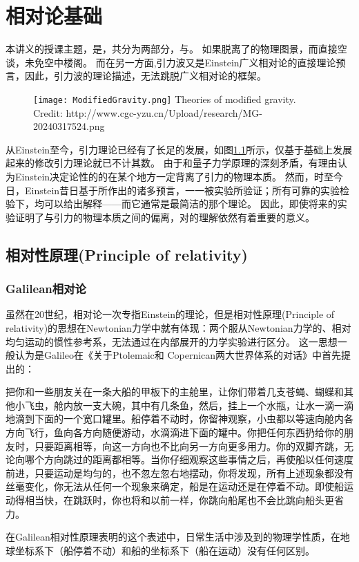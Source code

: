 \chapter{相对论基础}

本讲义的授课主题，是\gw\DA，共分为两部分，\emph{\gw}与\emph{\DA}。
如果脱离了\gw 的物理图景，而直接空谈\DA，未免空中楼阁。
而在另一方面,引力波又是Einstein广义相对论的直接理论预言，因此，引力波的理论描述，无法跳脱广义相对论的框架。

\begin{figure}[htp]
\centering
\texttt{[image: ModifiedGravity.png]}
  {Theories of modified gravity. Credit: http://www.cgc-yzu.cn/Upload/research/MG-20240317524.png}
\label{fig:ModGrav}
\end{figure}

从Einstein至今，引力理论已经有了长足的发展，如图\ref{fig:ModGrav}所示，仅基于\GR 基础上发展起来的修改引力理论就已不计其数。
由于和量子力学原理的深刻矛盾，有理由认为Einstein决定论性的的\GR 在某个地方一定背离了引力的物理本质。
然而，时至今日，Einstein昔日基于\GR 所作出的诸多预言，一一被实验所验证；所有可靠的实验检验下，\GR 均可以给出解释——而它通常是最简洁的那个理论。
因此，即使将来的实验证明了\GR 与引力的物理本质之间的偏离，对\GR 的理解依然有着重要的意义。

\section{相对性原理(Principle of relativity)}

\subsection{Galilean相对论}
虽然在20世纪，相对论一次专指Einstein的理论，但是相对性原理(Principle of relativity)的思想在Newtonian力学中就有体现：两个服从Newtonian力学的、相对均匀运动的惯性参考系，无法通过在内部展开的力学实验进行区分。
这一思想一般认为是Galileo在《关于Ptolemaic和 Copernican两大世界体系的对话》中首先提出的\cite{Fang:2012blog}：
\begin{myprop}{}{}
把你和一些朋友关在一条大船的甲板下的主舱里，让你们带着几支苍蝇、蝴蝶和其他小飞虫，舱内放一支大碗，其中有几条鱼，然后，挂上一个水瓶，让水一滴一滴地滴到下面的一个宽口罐里。船停着不动时，你留神观察，小虫都以等速向舱内各方向飞行，鱼向各方向随便游动，水滴滴进下面的罐中。你把任何东西扔给你的朋友时，只要距离相等，向这一方向也不比向另一方向更多用力。你的双脚齐跳，无论向哪个方向跳过的距离都相等。当你仔细观察这些事情之后，再使船以任何速度前进，只要运动是均匀的，也不忽左忽右地摆动，你将发现，所有上述现象都没有丝毫变化，你无法从任何一个现象来确定，船是在运动还是在停着不动。即使船运动得相当快，在跳跃时，你也将和以前一样，你跳向船尾也不会比跳向船头更省力。
\end{myprop}
在Galilean相对性原理表明的这个表述中，日常生活中涉及到的物理学性质，在地球坐标系下（船停着不动）和船的坐标系下（船在运动）没有任何区别。

